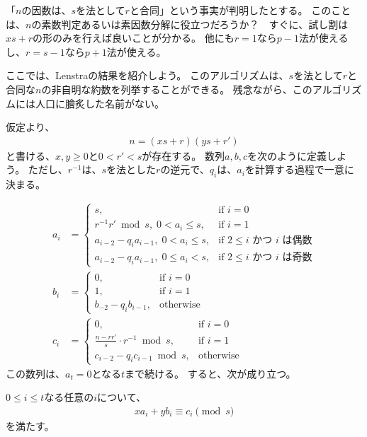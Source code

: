 「$n$の因数は、$s$を法として$r$と合同」という事実が判明したとする。
このことは、$n$の素数判定あるいは素因数分解に役立つだろうか？　すぐに、試し割は$xs+r$の形のみを行えば良いことが分かる。
他にも$r=1$なら$p-1$法が使えるし、$r=s-1$なら$p+1$法が使える。

ここでは、Lenstraの結果\cite{divisors_lenstra}を紹介しよう。
このアルゴリズムは、$s$を法として$r$と合同な$n$の非自明な約数を列挙することができる。
残念ながら、このアルゴリズムには人口に膾炙した名前がない。

仮定より、
\begin{align*}
n = (xs+r)(ys+r')
\end{align*}
と書ける、$x,y\ge0$と$0<r'<s$が存在する。
数列$a,b,c$を次のように定義しよう。
ただし、$r^{-1}$は、$s$を法とした$r$の逆元で、$q_i$は、$a_i$を計算する過程で一意に決まる。

\begin{align*}
a_i &= 
\begin{cases}
s, &\mbox{if } i = 0\\
r^{-1}r' \bmod{s}, \; 0< a_i \le s, &\mbox{if } i = 1\\
a_{i-2} - q_ia_{i-1}, \; 0< a_i \le s, &\mbox{if } 2 \le i \mbox{ かつ } i \mbox{ は偶数}\\
a_{i-2} - q_ia_{i-1}, \; 0\le a_i < s, &\mbox{if } 2 \le i \mbox{ かつ } i \mbox{ は奇数}
\end{cases}
\\
b_i &=
\begin{cases}
0, &\mbox{if } i = 0\\
1, &\mbox{if } i = 1\\
b_{-2} - q_ib_{i-1}, &\mbox{otherwise}
\end{cases}
\\
c_i &=
\begin{cases}
0, &\mbox{if } i = 0\\
\frac{n-rr'}{s}\cdot r^{-1} \bmod{s}, &\mbox{if } i = 1\\
c_{i-2}-q_ic_{i-1} \bmod{s}, &\mbox{otherwise}
\end{cases}
\end{align*}
この数列は、$a_t=0$となる$t$まで続ける。
すると、次が成り立つ。

\begin{Prop}{}{}
$0\le i \le t$なる任意の$i$について、
\begin{align*}
xa_i + yb_i \equiv c_i \pmod{s}
\end{align*}
を満たす。
\end{Prop}

